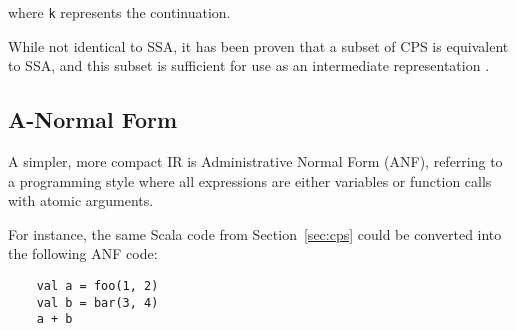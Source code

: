 \noindent where \texttt{k} represents the continuation.

While not identical to SSA, it has been proven that a subset of CPS is equivalent to SSA, and this
subset is sufficient for use as an intermediate representation \autocite{kelsey1993correspondence}.

\subsection{A-Normal Form}

A simpler, more compact IR is Administrative Normal Form (ANF), referring to a programming style
where all expressions are either variables or function calls with atomic arguments.

For instance, the same Scala code from Section~\ref{sec:cps} could be converted into the following
ANF code:

\begin{verbatim}
    val a = foo(1, 2)
    val b = bar(3, 4)
    a + b
\end{verbatim}
